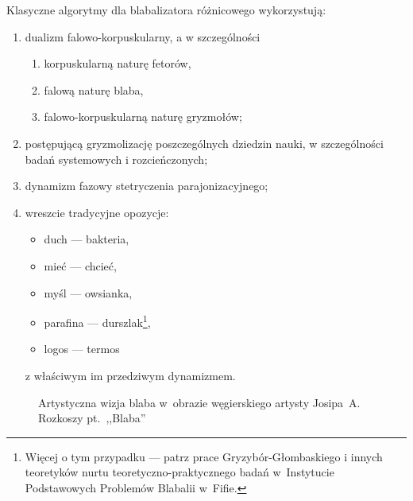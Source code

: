 Klasyczne algorytmy dla blabalizatora różnicowego wykorzystują:
\begin{enumerate}
    \item dualizm falowo-korpuskularny, a w szczególności
          \begin{enumerate}
              \item korpuskularną naturę fetorów,
              \item falową naturę blaba,
              \item falowo-korpuskularną naturę gryzmołów;
          \end{enumerate}
    \item postępującą gryzmolizację poszczególnych dziedzin nauki, w
          szczególności badań systemowych i rozcieńczonych;
    \item dynamizm fazowy stetryczenia parajonizacyjnego;
    \item wreszcie tradycyjne opozycje:
          \begin{itemize}
              \item duch --- bakteria,
              \item mieć --- chcieć,
              \item myśl --- owsianka,
              \item parafina --- durszlak\footnote{Więcej o tym przypadku --- patrz
                        prace Gryzybór-Głombaskiego i innych teoretyków nurtu
                        teoretyczno-praktycznego badań w~Instytucie Podstawowych
                        Problemów Blabalii w~Fifie.},
              \item logos --- termos%
          \end{itemize}
          z właściwym im przedziwym dynamizmem.
\end{enumerate}

\begin{figure}[tp]
    \centering
    \caption{Artystyczna wizja blaba w~obrazie węgierskiego artysty
        Josipa~A. Rozkoszy pt.~,,Blaba''}
\end{figure}
